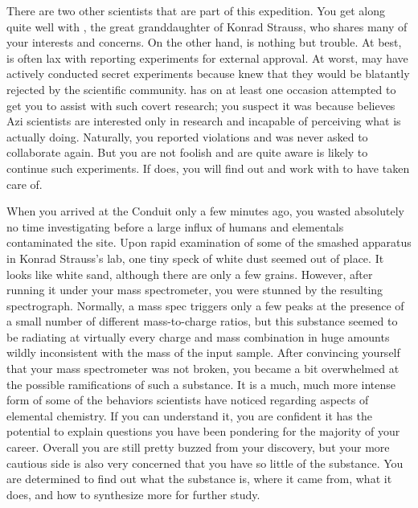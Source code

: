\documentclass[char]{elementals}
\begin{document}
There are two other scientists that are part of this expedition. You get along quite well with \cGD{\intro}, the great granddaughter of Konrad Strauss, who shares many of your interests and concerns. On the other hand, \cMS{\intro} is nothing but trouble. At best, \cMS{\they} is often lax with reporting \cMS{\their} experiments for external approval. At worst, \cMS{\they} may have actively conducted secret experiments because \cMS{\they} knew that they would be blatantly rejected by the scientific community. \cMS{\They} has on at least one occasion attempted to get you to assist with such covert research; you suspect it was because \cMS{\they} believes Azi scientists are interested only in research and incapable of perceiving what \cMS{\they} is actually doing. Naturally, you reported \cMS{\their} violations and was never asked to collaborate again. But you are not foolish and are quite aware \cMS{\they} is likely to continue such experiments. If \cMS{\they} does, you will find out and work with \cDiplomat{} to have \cMS{} taken care of.

When you arrived at the Conduit only a few minutes ago, you wasted absolutely no time investigating before a large influx of humans and elementals contaminated the site. Upon rapid examination of some of the smashed apparatus in Konrad Strauss's lab, one tiny speck of white dust seemed out of place. It looks like white sand, although there are only a few grains. However, after running it under your mass spectrometer, you were stunned by the resulting spectrograph. Normally, a mass spec triggers only a few peaks at the presence of a small number of different mass-to-charge ratios, but this substance seemed to be radiating at virtually every charge and mass combination in huge amounts wildly inconsistent with the mass of the input sample. After convincing yourself that your mass spectrometer was not broken, you became a bit overwhelmed at the possible ramifications of such a substance. It is a much, much more intense form of some of the behaviors scientists have noticed regarding aspects of elemental chemistry. If you can understand it, you are confident it has the potential to explain questions you have been pondering for the majority of your career. Overall you are still pretty buzzed from your discovery, but your more cautious side is also very concerned that you have so little of the substance. You are determined to find out what the substance is, where it came from, what it does, and how to synthesize more for further study.
\end{document}
